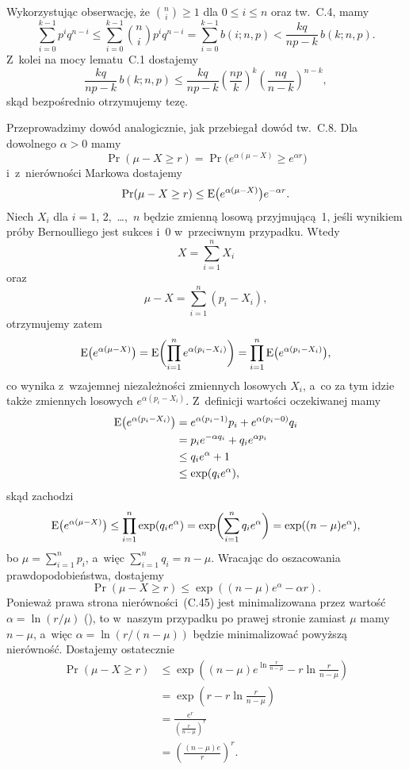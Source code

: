 \exercise{} %
Wykorzystując obserwację, że $\binom{n}{i}\ge1$ dla $0\le i\le n$ oraz tw.~C.4, mamy
\[
	\sum_{i=0}^{k-1}p^iq^{n-i} \le \sum_{i=0}^{k-1}\binom{n}{i}p^iq^{n-i} = \sum_{i=0}^{k-1}b(i;n,p) < \frac{kq}{np-k}\,b(k;n,p).
\]
Z~kolei na mocy lematu~C.1 dostajemy
\[
	\frac{kq}{np-k}\,b(k;n,p) \le \frac{kq}{np-k}\left(\frac{np}{k}\right)^k\left(\frac{nq}{n-k}\right)^{n-k},
\]
skąd bezpośrednio otrzymujemy tezę.

\exercise{} %
Przeprowadzimy dowód analogicznie, jak przebiegał dowód tw.~C.8. Dla dowolnego $\alpha>0$ mamy
\[
	\Pr(\mu-X\ge r) = \Pr\bigl(e^{\alpha(\mu-X)}\ge e^{\alpha r}\bigr)
\]
i~z~nierówności Markowa dostajemy
\[
	\Pr(\mu-X\ge r) \le \operatorname{E}\bigl(e^{\alpha(\mu-X)}\bigr)e^{-\alpha r}.
\]
Niech $X_i$ dla $i=1$, 2,~\dots,~$n$ będzie zmienną losową przyjmującą~1, jeśli wynikiem  próby Bernoulliego jest sukces i~0 w~przeciwnym przypadku. Wtedy
\[
	X = \sum_{i=1}^nX_i
\]
oraz
\[
	\mu-X = \sum_{i=1}^n(p_i-X_i),
\]
otrzymujemy zatem
\[
	\operatorname{E}\bigl(e^{\alpha(\mu-X)}\bigr) = \operatorname{E}\biggl(\prod_{i=1}^ne^{\alpha(p_i-X_i)}\biggr) = \prod_{i=1}^n\operatorname{E}\bigl(e^{\alpha(p_i-X_i)}\bigr),
\]
co wynika z~wzajemnej niezależności zmiennych losowych $X_i$, a~co za tym idzie także zmiennych losowych $e^{\alpha(p_i-X_i)}$. Z~definicji wartości oczekiwanej mamy
\begin{align*}
	\operatorname{E}\bigl(e^{\alpha(p_i-X_i)}\bigr) &= e^{\alpha(p_i-1)}p_i+e^{\alpha(p_i-0)}q_i \\
	&= p_ie^{-\alpha q_i}+q_ie^{\alpha p_i} \\
	&\le q_ie^{\alpha}+1 \\
	&\le \exp(q_ie^\alpha),
\end{align*}
skąd zachodzi
\[
	\operatorname{E}\bigl(e^{\alpha(\mu-X)}\bigr) \le \prod_{i=1}^n\exp(q_ie^\alpha) = \exp\biggl(\sum_{i=1}^nq_ie^\alpha\biggr) = \exp((n-\mu)e^\alpha),
\]
bo $\mu=\sum_{i=1}^np_i$, a~więc $\sum_{i=1}^nq_i=n-\mu$. Wracając do oszacowania prawdopodobieństwa, dostajemy
\[
	\Pr(\mu-X\ge r) \le \exp((n-\mu)e^\alpha-\alpha r).
\]
Ponieważ prawa strona nierówności~(C.45) jest minimalizowana przez wartość $\alpha=\ln(r/\mu)$ (), to w~naszym przypadku po prawej stronie zamiast $\mu$ mamy $n-\mu$, a~więc $\alpha=\ln(r/(n-\mu))$ będzie minimalizować powyższą nierówność. Dostajemy ostatecznie
\begin{align*}
	\Pr(\mu-X\ge r) &\le \exp\left((n-\mu)e^{\ln\frac{r}{n-\mu}}-r\ln\frac{r}{n-\mu}\right) \\
	&= \exp\left(r-r\ln\frac{r}{n-\mu}\right) \\
	&= \frac{e^r}{\left(\frac{r}{n-\mu}\right)^r} \\
	&= \left(\frac{(n-\mu)e}{r}\right)^r.
\end{align*}

